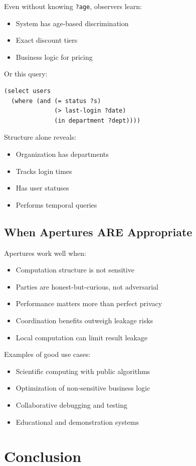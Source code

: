 \documentclass[10pt]{article}
\begin{document}
Even without knowing \texttt{?age}, observers learn:
\begin{itemize}
\item System has age-based discrimination
\item Exact discount tiers
\item Business logic for pricing
\end{itemize}

Or this query:
\begin{lstlisting}
(select users
  (where (and (= status ?s)
              (> last-login ?date)
              (in department ?dept))))
\end{lstlisting}

Structure alone reveals:
\begin{itemize}
\item Organization has departments
\item Tracks login times
\item Has user statuses
\item Performs temporal queries
\end{itemize}

\subsection{When Apertures ARE Appropriate}

Apertures work well when:
\begin{itemize}
\item Computation structure is not sensitive
\item Parties are honest-but-curious, not adversarial
\item Performance matters more than perfect privacy
\item Coordination benefits outweigh leakage risks
\item Local computation can limit result leakage
\end{itemize}

Examples of good use cases:
\begin{itemize}
\item Scientific computing with public algorithms
\item Optimization of non-sensitive business logic
\item Collaborative debugging and testing
\item Educational and demonstration systems
\end{itemize}

\section{Conclusion}
\end{document}
